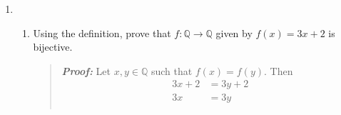 \documentclass{article}
\newcommand{\Proof}{\textit{\textbf{Proof: }}}
\newcommand{\ZZ}{\mathbb{Z}}
\newcommand{\QQ}{\mathbb{Q}}
\begin{document}
\begin{enumerate}
\begin{enumerate}
\item Establish the following identity using induction.
\[
\sum_{i = 1}^{n}i^{3} = \left(\frac{n(n+1)}{2}\right)^{2}
\]
\begin{quote}
\Proof \\
\textit{\textbf{Base Case: }} $n = 1$
\begin{align*}
\sum_{i = 1}^{1}i^{3} &= \left(\frac{1(1+1)}{2}\right)^{2}\\
1 ^{3} &= \left(\frac{2}{2}\right)^{2}\\
1 &= 1
\end{align*}
\textit{\textbf{Assume: }} $$\sum_{i = 1}^{n}i^{3} = \left(\frac{n(n+1)}{2}\right)^{2}$$
\textit{\textbf{Prove: }}  
\[
\sum_{i = 1}^{n + 1}i^{3} = \left(\frac{(n + 1)(n+2)}{2}\right)^{2}
\]
\begin{align*}
\therefore \sum_{i = 1}^{n}i^{3} + \sum_{i = n + 1}^{n + 1}i^{3} &= \left(\frac{n(n+1)}{2}\right)^{2} + (n + 1)^{3}\ \ \text{By the Induction Hypothesis}\\
&= \frac{n^{2}(n+1)^{2}}{4} + (n+1)^{3}\\
&= \frac{n^{2}(n+1)^{2}}{4} + \frac{4(n+1)^{3}}{4}\\
&= \frac{n^{2}(n+1)^{2} + 4(n+1)^{3}}{4}\\
&= \frac{(n+1)^{2}(n^{2} + 4n + 4)}{4}\\
&= \frac{(n+1)^{2}(n+2)^{2}}{2^{2}}\\
&= \left(\frac{(n+1)(n+2)}{2}\right)^{2}
\end{align*}
\end{quote}
$\triangle$
\item Prove that if $n^{3}$ is odd, then $n$ is odd.
\begin{quote}
\Proof Assume the contrapositive: if $n$ is even, then $n^{3}$ is even.
Then $n = 2k$ for $k\in \ZZ$, which mean that $n^{3} = (2k)^{3}$.
$(2k)^{3} = 2(2^{2}k^{3})$ where $(2^{2}k^{3}) \in \ZZ$. Therefore $n^{3}$ is even.
\end{quote}
$\triangle$
\end{enumerate}
\newpage
\item
\begin{enumerate}
\item Using the definition, prove that $f: \QQ \to \QQ$ given by $f(x) = 3x+2$ is bijective.
\begin{quote}
\Proof Let $x,y \in \QQ$ such that $f(x) = f(y)$. Then
\begin{align*}
3x + 2 &= 3y + 2\\
3x &= 3y\\

\end{align*}
\end{quote}
\end{enumerate}
\end{enumerate}
\end{document}

